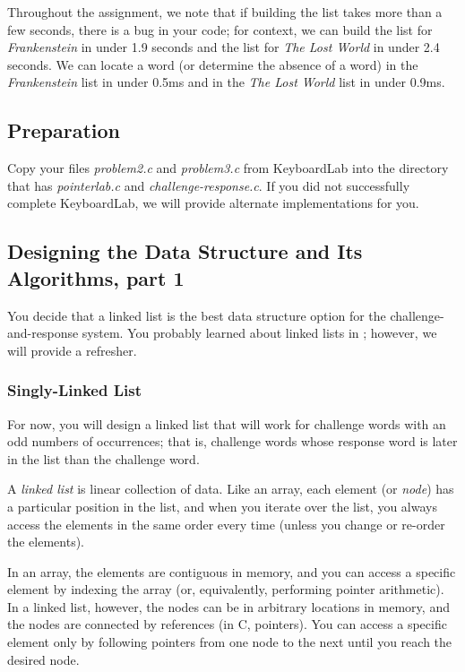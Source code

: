 Throughout the assignment, we note that if building the list takes
more than a few seconds, there is a bug in your code; for context, we can build
the list for \textit{Frankenstein} in under 1.9 seconds and the list for
\textit{The Lost World} in under 2.4 seconds. We can locate a word (or
determine the absence of a word) in the \textit{Frankenstein} list in under
0.5ms and in the \textit{The Lost World} list in under 0.9ms.

\subsection{Preparation}

Copy your files \textit{problem2.c} and \textit{problem3.c} from KeyboardLab
into the directory that has \textit{pointerlab.c} and
\textit{challenge-response.c}. If you did not successfully complete
KeyboardLab, we will provide alternate implementations for you.

\subsection{Designing the Data Structure and Its Algorithms, part 1}

You decide that a linked list is the best data structure option for the
challenge-and-response system. You probably learned about linked lists in
\cstwo; however, we will provide a refresher.

\subsubsection{Singly-Linked List}\label{sec:SinglyLinkedList}

For now, you will design a linked list that will work for challenge words with
an odd numbers of occurrences; that is, challenge words whose response word is
later in the list than the challenge word.

A \textit{linked list} is linear collection of data. Like an array, each
element (or \textit{node}) has a particular position in the list, and when you
iterate over the list, you always access the elements in the same order every
time (unless you change or re-order the elements).

In an array, the elements are contiguous in memory, and you can access a
specific element by indexing the array (or, equivalently, performing pointer
arithmetic). In a linked list, however, the nodes can be in arbitrary locations
in memory, and the nodes are connected by references (in C, pointers). You can
access a specific element only by following pointers from one node to the next
until you reach the desired node.

